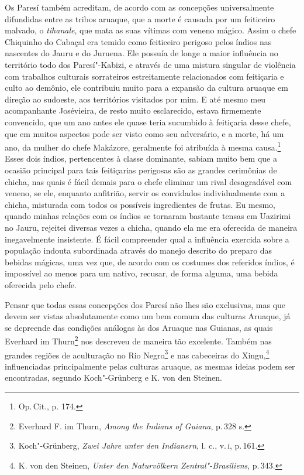 Os Paresí também acreditam, de acordo com as concepções universalmente
difundidas entre as tribos aruaque, que a morte é causada por um
feiticeiro malvado, o \textit{tihanale}, que mata as suas vítimas com
veneno mágico. Assim o chefe Chiquinho do Cabaçal era temido como
feiticeiro perigoso pelos índios nas nascentes do Jauru e do Juruena.
Ele possuía de longe a maior influência no território todo dos
Paresí"-Kabizi, e através de uma mistura singular de violência com
trabalhos culturais sorrateiros estreitamente relacionados com
feitiçaria e culto ao demônio, ele contribuiu muito para a expansão da
cultura aruaque em direção ao sudoeste, aos territórios visitados por
mim. E até mesmo meu acompanhante Josévieira, de resto muito
esclarecido, estava firmemente convencido, que um ano antes ele quase
teria sucumbido à feitiçaria desse chefe, que em muitos aspectos pode
ser visto como seu adversário, e a morte, há um ano, da mulher do chefe
Makázore, geralmente foi atribuída à mesma causa.\footnote{Op.\,Cit., p.
  174.} Esses dois índios, pertencentes à classe dominante, sabiam
muito bem que a ocasião principal para tais feitiçarias perigosas são
as grandes cerimônias de chicha, nas quais é fácil demais para o chefe
eliminar um rival desagradável com veneno, se ele, enquanto anfitrião,
servir os convidados individualmente com a chicha, misturada com todos
os possíveis ingredientes de frutas. Eu mesmo, quando minhas relações
com os índios se tornaram bastante tensas em Uazirimi no Jauru,
rejeitei diversas vezes a chicha, quando ela me era oferecida de
maneira inegavelmente insistente. É fácil compreender qual a influência
exercida sobre a população indouta subordinada através do manejo
descrito do preparo das bebidas mágicas, uma vez que, de acordo com os
costumes dos referidos índios, é impossível ao menos para um nativo,
recusar, de forma alguma, uma bebida oferecida pelo chefe.

Pensar que todas essas concepções dos Paresí não lhes são exclusivas,
mas que devem ser vistas absolutamente como um bem comum das culturas
Aruaque, já se depreende das condições análogas às dos Aruaque nas
Guianas, as quais Everhard im Thurn\footnote{Everhard F. im Thurn,
  \textit{Among the Indians of Guiana}, p.\,328 s.} nos descreveu de
maneira tão excelente. Também nas grandes regiões de aculturação no Rio
Negro\footnote{Koch"-Grünberg, \textit{Zwei Jahre unter den Indianern}, l.
  c., v.\,\textsc{i}, p.\,161.} e nas cabeceiras do Xingu,\footnote{K. von den
  Steinen, \textit{Unter den Naturvölkern Zentral"-Brasiliens}, p.\,343.}
influenciadas principalmente pelas culturas aruaque, as mesmas ideias
podem ser encontradas, segundo Koch"-Grünberg e K. von den Steinen.

